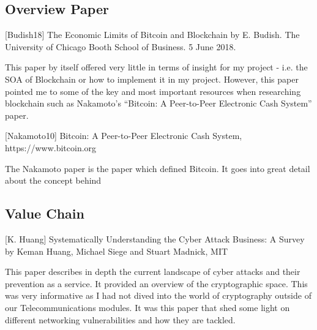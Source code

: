 \subsection{Overview Paper}
[Budish18]  The Economic Limits of Bitcoin and Blockchain by E. Budish. The University of Chicago Booth School of Business. 5 June 2018.


This paper by itself offered very little in terms of insight for my project - i.e. the SOA of Blockchain or how to implement it in my project. However, this paper pointed me to some of the key and most important resources when researching blockchain such as Nakamoto’s “Bitcoin: A Peer-to-Peer Electronic Cash System” paper. 

[Nakamoto10] Bitcoin: A Peer-to-Peer Electronic Cash System, https://www.bitcoin.org

The Nakamoto paper is the paper which defined Bitcoin. It goes into great detail about the concept behind 

\subsection{Value Chain}
[K. Huang] Systematically Understanding the Cyber Attack Business: A Survey by Keman Huang, Michael Siege and Stuart Madnick, MIT 

This paper describes in depth the current landscape of cyber attacks and their prevention as a service. It provided an overview of the cryptographic space. This was very informative as I had not dived into the world of cryptography outside of our Telecommunications modules. It was this paper that shed some light on different networking vulnerabilities and how they are tackled.

